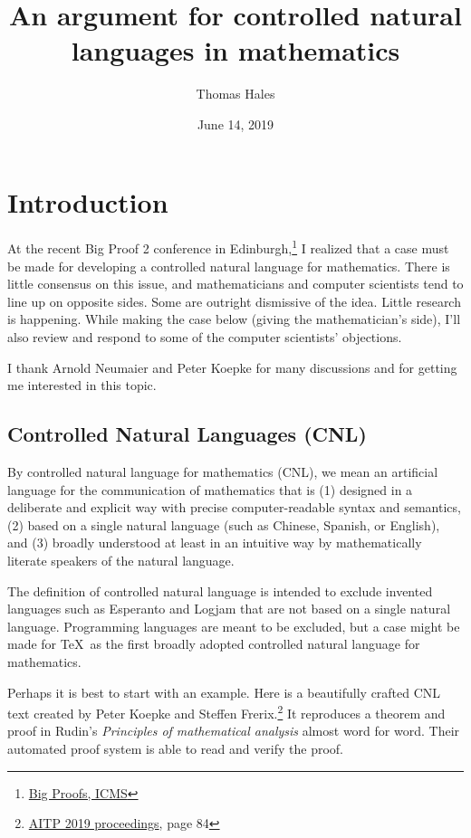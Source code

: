 \documentclass[12pt]{amsart}
\title{An argument for controlled natural languages in mathematics}
\date{June 14, 2019}                                           %
\author{Thomas Hales}
\renewcommand{\~}{\ }
\renewcommand{\_}{\textunderscore}
\begin{document}
\maketitle

\section{Introduction}

At the recent Big Proof 2 conference in
Edinburgh,\footnote{\href{https://www.icms.org.uk/bigproof.php}{Big
    Proofs, ICMS}} I realized that a case must be made for developing
a controlled natural language for mathematics.  There is little
consensus on this issue, and mathematicians and computer scientists
tend to line up on opposite sides.  Some are outright dismissive of
the idea.  Little research is happening.  While making the case below
(giving the mathematician's side), I'll also review and respond to
some of the computer scientists' objections.

I thank Arnold Neumaier and Peter Koepke for many discussions and for
getting me interested in this topic.

\subsection{Controlled Natural Languages (CNL)}\label{sub:CNL}

By controlled natural language for mathematics (CNL), we mean an
artificial language for the communication of mathematics that is (1)
designed in a deliberate and explicit way with precise
computer-readable syntax and semantics, (2) based on a single natural
language (such as Chinese, Spanish, or English), and (3) broadly
understood at least in an intuitive way by mathematically literate
speakers of the natural language.

The definition of controlled natural language is intended to exclude
invented languages such as Esperanto and Logjam that are not based on
a single natural language.  Programming languages are meant to be
excluded, but a case might be made for \TeX\ as the first broadly
adopted controlled natural language for mathematics.

Perhaps it is best to start with an example.  Here is a beautifully
crafted CNL text created by Peter Koepke and Steffen
Frerix.\footnote{\href{http://aitp-conference.org/2019/aitp19-proceedings.pdf}{AITP
    2019 proceedings}, page 84} It reproduces a theorem and proof in
Rudin's {\it Principles of mathematical analysis} almost word for
word. Their automated proof system is able to read and verify the
proof.
\end{document}
